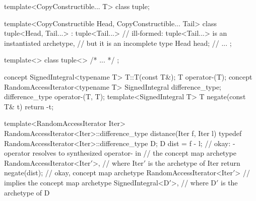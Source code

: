 \documentclass[american]{book}
\begin{document}
\begin{paras}
\pnum
{}
\begin{codeblock}
template<CopyConstructible... T> class tuple;

template<CopyConstructible Head, CopyConstructible... Tail>
class tuple<Head, Tail...> : tuple<Tail...> // ill-formed: tuple<Tail...> is an instantiated archetype, 
                                            // but it is an incomplete type
{
  Head head;
  // ...
};

template<> class tuple<> { /* ... */ };

\end{codeblock}
\addedConcepts{\mbox{\exitexample\exitnote}}

\pnum
{}
\begin{codeblock}
concept SignedIntegral<typename T> {
  T::T(const T&);
  T operator-(T);
}
concept RandomAccessIterator<typename T> {
  SignedIntegral difference_type;
  difference_type operator-(T, T);
}
template<SignedIntegral T> T negate(const T& t) { return -t; }

template<RandomAccessIterator Iter>
RandomAccessIterator<Iter>::difference_type distance(Iter f, Iter l) {
  typedef RandomAccessIterator<Iter>::difference_type D;
  D dist = f - l;  // okay: - operator resolves to synthesized operator- in
                  // the concept map archetype RandomAccessIterator<Iter$'$>,  
                  // where Iter$'$ is the archetype of Iter
  return negate(dist); // okay, concept map archetype RandomAccessIterator<Iter$'$>
                       // implies the concept map archetype SignedIntegral<D$'$>,
                       // where D$'$ is the archetype of D}
\end{codeblock}
\addedConcepts{\mbox{\exitexample}}


\end{paras}
\end{document}
